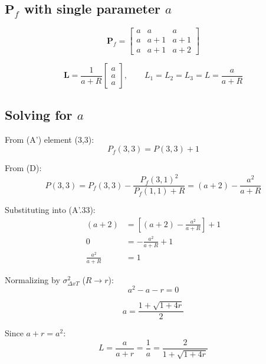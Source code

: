 \documentclass[11pt]{article}
\newcommand{\Pf}{\mathbf{P}_f}
\newcommand{\Lm}{\mathbf{L}}
\begin{document}
\subsection*{$\Pf$ with single parameter $a$}
\begin{equation}
\boxed{
\Pf = \begin{bmatrix} a & a & a \\ a & a+1 & a+1 \\ a & a+1 & a+2 \end{bmatrix}
}
\end{equation}

\begin{equation}
\Lm = \frac{1}{a+R}\begin{bmatrix}a\\a\\a\end{bmatrix}, \qquad
L_1 = L_2 = L_3 = L = \frac{a}{a+R}
\end{equation}

\subsection*{Solving for $a$}

From (A') element (3,3):
\begin{equation}
P_f(3,3) = P(3,3) + 1 \tag{A'.33}
\end{equation}

From (D):
\begin{equation}
P(3,3) = P_f(3,3) - \frac{P_f(3,1)^2}{P_f(1,1)+R} = (a+2) - \frac{a^2}{a+R} \tag{D.33}
\end{equation}

Substituting into (A'.33):
\begin{align}
(a+2) &= \left[(a+2) - \frac{a^2}{a+R}\right] + 1 \\[6pt]
0 &= -\frac{a^2}{a+R} + 1 \\[6pt]
\frac{a^2}{a+R} &= 1
\end{align}

Normalizing by $\sigma^2_{\Delta xT}$ ($R \to r$):
\begin{equation}
\boxed{a^2 - a - r = 0}
\end{equation}

\begin{equation}
\boxed{a = \frac{1 + \sqrt{1+4r}}{2}}
\end{equation}

Since $a + r = a^2$:
\begin{equation}
\boxed{L = \frac{a}{a+r} = \frac{1}{a} = \frac{2}{1+\sqrt{1+4r}}}
\end{equation}
\end{document}
